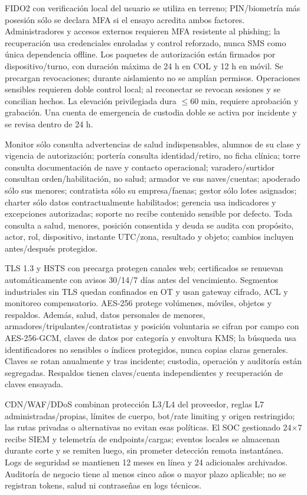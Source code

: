 \documentclass[11pt,letterpaper]{report}
\begin{document}
FIDO2 con verificación local del usuario se utiliza en terreno; PIN/biometría más posesión sólo se declara MFA si el ensayo acredita ambos factores. Administradores y accesos externos requieren MFA resistente al phishing; la recuperación usa credenciales enroladas y control reforzado, nunca SMS como única dependencia offline. Los paquetes de autorización están firmados por dispositivo/turno, con duración máxima de 24 h en COL y 12 h en móvil. Se precargan revocaciones; durante aislamiento no se amplían permisos. Operaciones sensibles requieren doble control local; al reconectar se revocan sesiones y se concilian hechos. La elevación privilegiada dura $\leq$60 min, requiere aprobación y grabación. Una cuenta de emergencia de custodia doble se activa por incidente y se revisa dentro de 24 h.

Monitor sólo consulta advertencias de salud indispensables, alumnos de su clase y vigencia de autorización; portería consulta identidad/retiro, no ficha clínica; torre consulta documentación de nave y contacto operacional; varadero/surtidor consultan orden/habilitación, no salud; armador ve sus naves/cuentas; apoderado sólo sus menores; contratista sólo su empresa/faenas; gestor sólo lotes asignados; charter sólo datos contractualmente habilitados; gerencia usa indicadores y excepciones autorizadas; soporte no recibe contenido sensible por defecto. Toda consulta a salud, menores, posición consentida y deuda se audita con propósito, actor, rol, dispositivo, instante UTC/zona, resultado y objeto; cambios incluyen antes/después protegidos.

TLS 1.3 y HSTS con precarga protegen canales web; certificados se renuevan automáticamente con avisos 30/14/7 días antes del vencimiento. Segmentos industriales sin TLS quedan confinados en OT y usan gateway cifrado, ACL y monitoreo compensatorio. AES-256 protege volúmenes, móviles, objetos y respaldos. Además, salud, datos personales de menores, armadores/tripulantes/contratistas y posición voluntaria se cifran por campo con AES-256-GCM, claves de datos por categoría y envoltura KMS; la búsqueda usa identificadores no sensibles o índices protegidos, nunca copias claras generales. Claves se rotan anualmente y tras incidente; custodia, operación y auditoría están segregadas. Respaldos tienen claves/cuenta independientes y recuperación de claves ensayada.

CDN/WAF/DDoS combinan protección L3/L4 del proveedor, reglas L7 administradas/propias, límites de cuerpo, bot/rate limiting y origen restringido; las rutas privadas o alternativas no evitan esas políticas. El SOC gestionado 24$\times$7 recibe SIEM y telemetría de endpoints/cargas; eventos locales se almacenan durante corte y se remiten luego, sin prometer detección remota instantánea. Logs de seguridad se mantienen 12 meses en línea y 24 adicionales archivados. Auditoría de negocio tiene al menos cinco años o mayor plazo aplicable; no se registran tokens, salud ni contraseñas en logs técnicos.
\end{document}
